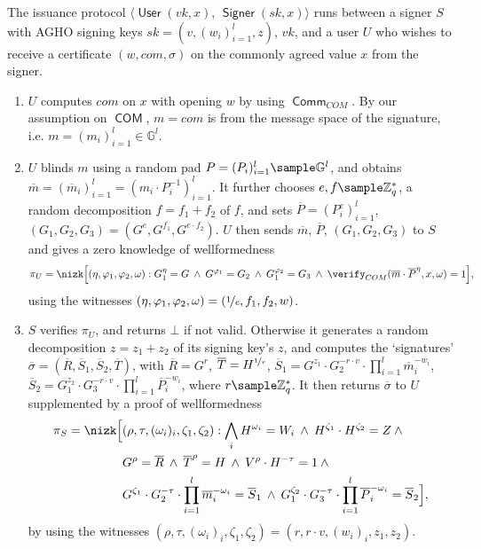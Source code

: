 \documentclass[runningheads]{llncs}
\newcommand{\Z}{\mathbb{Z}}
\DeclareMathOperator{\user}{\mathsf{User}}
\DeclareMathOperator{\signer}{\mathsf{Signer}}
\DeclareMathOperator{\COM}{\ensuremath{\mathsf{COM}}}
\DeclareMathOperator{\comm}{\mathsf{Comm}}
\begin{document}
\begin{definition}
\label{prot:blindAGHO}
The issuance protocol $\big\langle\user(vk,x)$, $\signer(sk,x)\big\rangle$
runs between a signer $S$ with AGHO signing keys $sk=(v, (w_i)_{i=1}^l, z)$, $vk$, and a user $U$ who wishes to receive a certificate $(w, com, \sigma)$ on the commonly agreed value $x$ from the signer.
\begin{enumerate}
\item
$U$ computes $com$ on $x$ with opening $w$ by using $\comm_{COM}$.
By our assumption on $\COM$, $m=com$ is from the message space of the signature, i.e.  
$m = (m_i)_{i=1}^l\in \mathbb G^l$. 

\item
\label{prot:blindAGHO:step1}
$U$ blinds $m$ using a random pad $P=(P_i)_{i=1}^l\sample\mathbb G^l$, and obtains
$\overline m=\left(\overline m_i\right)_{i=1}^l = \left(m_i\cdot P_i^{-1}\right)_{i=1}^l$. 
It further chooses $e, f\sample\Z_q^*$, a random decomposition $f=f_1 + f_2$ of $f$, 
and sets  $\overline P = \left(P_i^{e}\right)_{i=1}^l$, $(G_1, G_2,G_3) = (G^e,G^{f_1}, G^{e\cdot f_2})$.
$U$ then sends $\overline m$, $\overline P$, $(G_1,G_2,G_3)$ to $S$ and gives a zero knowledge of wellformedness
\begin{equation*}
\pi_U=\nizk\Big[ (\eta, \varphi_1, \varphi_2, \omega) : G_1^\eta = G \:\wedge\: G^{\varphi_1}= G_2 \:\wedge\:
G_1^{\varphi_2} = G_3
\:\wedge\: \verify_{COM}(\overline m \cdot \overline P^\eta, x, \omega) = 1
\Big],
\end{equation*}
using the witnesses $(\eta, \varphi_1, \varphi_2,\omega) = (\nicefrac{1}{e},f_1,f_2,w)$.


 \item
\label{prot:blindAGHO:step2}
$S$ verifies $\pi_U$, and returns $\bot$ if not valid.
Otherwise it generates  a random decomposition $z=z_1+z_2$ of its signing key's  $z$,
and computes the `signatures' $\overline\sigma = \left(\overline R, \overline S_1, \overline S_2, \overline T\right)$, with $\overline R = G^r$, $\overline T= H^{\nicefrac{1}{r}}$, 
 $\overline S_1 = G^{z_1} \cdot G_2^{-r\cdot v} \cdot \prod_{i=1}^l \overline m_i^{-w_i}$, 
 $\overline S_2 = G_1^{z_2} \cdot G_3^{-r\cdot v} \cdot \prod_{i=1}^l \overline P_i^{-w_i}$, where $r\sample \Z_q^*$.
It then returns $\overline\sigma$ to $U$ supplemented by a proof of wellformedness 
\[
\begin{aligned}
\pi_S=\nizk\Big[&(\rho, \tau, (\omega_i)_i,  \zeta_1, \zeta_2) :
	\bigwedge_{i} H^{\omega_i} = W_i \:\wedge\:H^{\zeta_1}\cdot H^{\zeta_2} = Z \:\wedge\:
	\\
	&G^\rho =\overline R \:\wedge\: \overline T^\rho = H \:\wedge\: 
	V^\rho \cdot H^{-\tau}=1 \:\wedge\: 
	\\
	&G^{\zeta_1}\cdot G_2^{- \tau} \cdot \prod_{i=1}^l \overline m_i^{-\omega_i} = \overline S_1
	\:\wedge\:
        G_1^{\zeta_2}\cdot G_3^{-\tau} \cdot \prod_{i=1}^l \overline P_i^{-\omega_i} = \overline S_2
\Big],
\end{aligned}
\] 
by using the witnesses $(\rho, \tau, (\omega_i)_i,  \zeta_1, \zeta_2) = (r, r\cdot v, (w_i)_i,  z_1, z_2)$.
 

\end{enumerate}
\end{definition}
\end{document}
